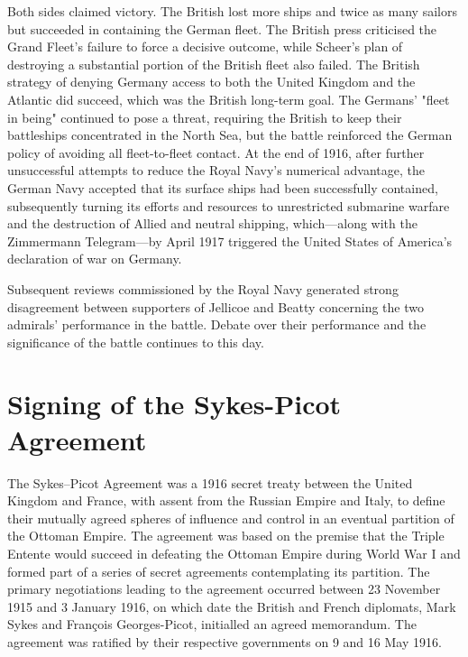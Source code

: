 \documentclass[a4paper,]{book}
\begin{document}
Both sides claimed victory. The British lost more ships and twice as many sailors but succeeded in containing the German fleet. The British press criticised the Grand Fleet's failure to force a decisive outcome, while Scheer's plan of destroying a substantial portion of the British fleet also failed. The British strategy of denying Germany access to both the United Kingdom and the Atlantic did succeed, which was the British long-term goal. The Germans' "fleet in being" continued to pose a threat, requiring the British to keep their battleships concentrated in the North Sea, but the battle reinforced the German policy of avoiding all fleet-to-fleet contact. At the end of 1916, after further unsuccessful attempts to reduce the Royal Navy's numerical advantage, the German Navy accepted that its surface ships had been successfully contained, subsequently turning its efforts and resources to unrestricted submarine warfare and the destruction of Allied and neutral shipping, which—along with the Zimmermann Telegram—by April 1917 triggered the United States of America's declaration of war on Germany.

Subsequent reviews commissioned by the Royal Navy generated strong disagreement between supporters of Jellicoe and Beatty concerning the two admirals' performance in the battle. Debate over their performance and the significance of the battle continues to this day. 

\section{Signing of the Sykes-Picot Agreement}

The Sykes–Picot Agreement was a 1916 secret treaty between the United Kingdom and France, with assent from the Russian Empire and Italy, to define their mutually agreed spheres of influence and control in an eventual partition of the Ottoman Empire. The agreement was based on the premise that the Triple Entente would succeed in defeating the Ottoman Empire during World War I and formed part of a series of secret agreements contemplating its partition. The primary negotiations leading to the agreement occurred between 23 November 1915 and 3 January 1916, on which date the British and French diplomats, Mark Sykes and François Georges-Picot, initialled an agreed memorandum. The agreement was ratified by their respective governments on 9 and 16 May 1916.
\end{document}
